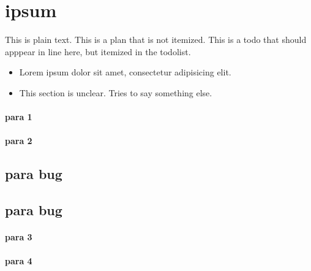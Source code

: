 \section{ipsum}
\label{autosec:4}
This is plain text.
{\color{blue}This is a plan that is not itemized.}
{\color{red}This is a todo that should apppear in line here, but itemized in the todolist.}
    \begin{itemize}[noitemsep]
        \item Lorem ipsum dolor sit amet, consectetur adipisicing elit.
        \item {\color{OliveGreen}This section is unclear.}
{\color{OliveGreen}Tries to say something else.}
    \end{itemize}
\paragraph{para 1}
\label{autosec:5}
\paragraph{para 2}
\label{autosec:5}
\subsection{para bug}
\label{autosec:5}
\vspace{-36pt}\hspace{11pt}
\subsection{para bug}
\label{autosec:6}
\vspace{-36pt}\hspace{11pt}
\paragraph{para 3}
\label{autosec:7}
\paragraph{para 4}
\label{autosec:7}
